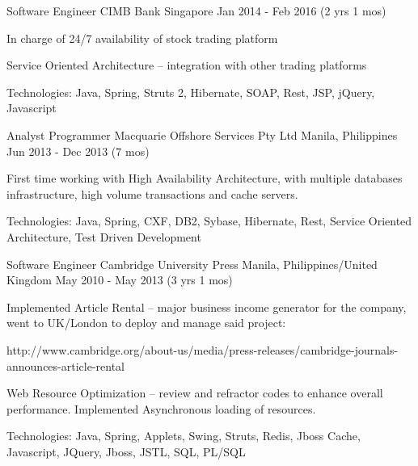 \begin{cventries}
  \cventry
  {Software Engineer} %
  {CIMB Bank} %
  {Singapore} %
  {Jan 2014 - Feb 2016 (2 yrs 1 mos)} %
  {
    \begin{cvitems} %
      \item {In charge of 24/7 availability of stock trading platform}
      \item {Service Oriented Architecture – integration with other trading platforms}
      \item {Technologies: Java, Spring, Struts 2, Hibernate, SOAP, Rest, JSP, jQuery, Javascript}
    \end{cvitems}
  }

  \cventry
  {Analyst Programmer} %
  {Macquarie Offshore Services Pty Ltd} %
  {Manila, Philippines} %
  {Jun 2013 - Dec 2013 (7 mos)} %
  {
    \begin{cvitems} %
      \item {First time working with High Availability Architecture, with multiple databases infrastructure, high volume transactions and cache servers.}
      \item {Technologies: Java, Spring, CXF, DB2, Sybase, Hibernate, Rest, Service Oriented Architecture, Test Driven Development}
    \end{cvitems}
  }

  \cventry
  {Software Engineer} %
  {Cambridge University Press} %
  {Manila, Philippines/United Kingdom} %
  {May 2010 - May 2013 (3 yrs 1 mos)} %
  {
    \begin{cvitems} %
      \item {Implemented Article Rental – major business income generator for the company, went to UK/London to deploy and manage said project:}
      \item {http://www.cambridge.org/about-us/media/press-releases/cambridge-journals-announces-article-rental}
      \item {Web Resource Optimization – review and refractor codes to enhance overall performance. Implemented Asynchronous loading of resources.}
      \item {Technologies: Java, Spring, Applets, Swing, Struts, Redis, Jboss Cache, Javascript, JQuery, Jboss, JSTL, SQL, PL/SQL}
    \end{cvitems}
  }
\end{cventries}
